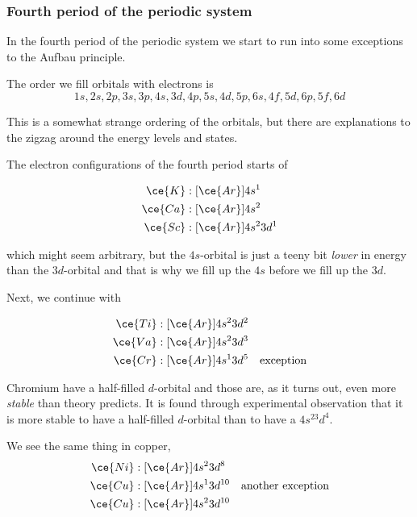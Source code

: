 \documentclass[../mit-general-chemistry.tex]{subfiles}
\begin{document}
\subsubsection{Fourth period of the periodic system}

In the fourth period of the periodic system we start to run into some
exceptions to the Aufbau principle.

The order we fill orbitals with electrons is
\begin{equation*}
  1s, 2s, 2p, 3s, 3p, 4s, 3d, 4p, 5s, 4d, 5p, 6s, 4f, 5d, 6p, 5f, 6d
\end{equation*}

This is a somewhat strange ordering of the orbitals, but there are
explanations to the zigzag around the energy levels and states.

The electron configurations of the fourth period starts of

\begin{align*}
  \ce{K} &: [\ce{Ar}]4s^1 \\
  \ce{Ca} &: [\ce{Ar}]4s^2 \\
  \ce{Sc} &: [\ce{Ar}]4s^23d^1 \\
\end{align*}

which might seem arbitrary, but the $4s$-orbital is just a teeny bit
{\em lower} in energy than the $3d$-orbital and that is why we fill up
the $4s$ before we fill up the $3d$.

Next, we continue with 

\begin{align*}
  \ce{Ti} &: [\ce{Ar}]4s^23d^2 \\
  \ce{Va} &: [\ce{Ar}]4s^23d^3 \\
  \ce{Cr} &: [\ce{Ar}]4s^13d^5 &\text{exception} \\
\end{align*}

Chromium have a half-filled $d$-orbital and those are, as it turns
out, even more {\em stable} than theory predicts. It is found through
experimental observation that it is more stable to have a half-filled
$d$-orbital than to have a $4s^23d^4$.

We see the same thing in copper, 
\begin{align*}
  \ce{Ni} &: [\ce{Ar}]4s^23d^{8} \\
  \ce{Cu} &: [\ce{Ar}]4s^13d^{10} &\text{another exception} \\
  \ce{Cu} &: [\ce{Ar}]4s^23d^{10} \\
\end{align*}
\end{document}
